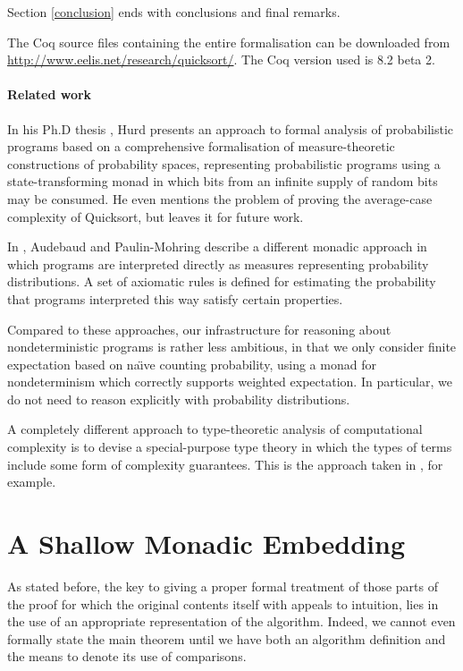 \documentclass[runningheads]{llncs}
\begin{document}
Section \ref{conclusion} ends with conclusions and final remarks.

The Coq source files containing the entire formalisation can be downloaded from \url{http://www.eelis.net/research/quicksort/}. The Coq version used is 8.2 beta 2.

\paragraph{Related work}

In his Ph.D thesis \cite{hurd}, Hurd presents an approach to formal analysis
of probabilistic programs based on a comprehensive formalisation of
measure-theoretic constructions of probability spaces, representing
probabilistic programs using a state-transforming monad in which bits from an
infinite supply of random bits may be consumed. He even mentions the problem
of proving the average-case complexity of Quicksort, but leaves it for future work.

In \cite{mohringaudebaud}, Audebaud and Paulin-Mohring describe a different monadic approach in which programs are interpreted directly as measures representing probability distributions. A set of axiomatic rules is defined for estimating the probability that programs interpreted this way satisfy certain properties.

Compared to these approaches, our infrastructure for reasoning about nondeterministic programs is rather less ambitious, in that we only consider finite expectation based on na{\"\i}ve counting probability, using a monad for nondeterminism which correctly supports weighted expectation. In particular, we do not need to reason explicitly with probability distributions.

A completely different approach to type-theoretic analysis of computational complexity is to devise a special-purpose type theory in which the types of terms include some form of complexity guarantees. This is the approach taken in \cite{constable}, for example.

\section{A Shallow Monadic Embedding}
\label{embed}

As stated before, the key to giving a proper formal treatment of those parts of the proof for which the original contents itself with appeals to intuition, lies in the use of an appropriate representation of the algorithm. Indeed, we cannot even formally state the main theorem until we have both an algorithm definition and the means to denote its use of comparisons.
\end{document}
